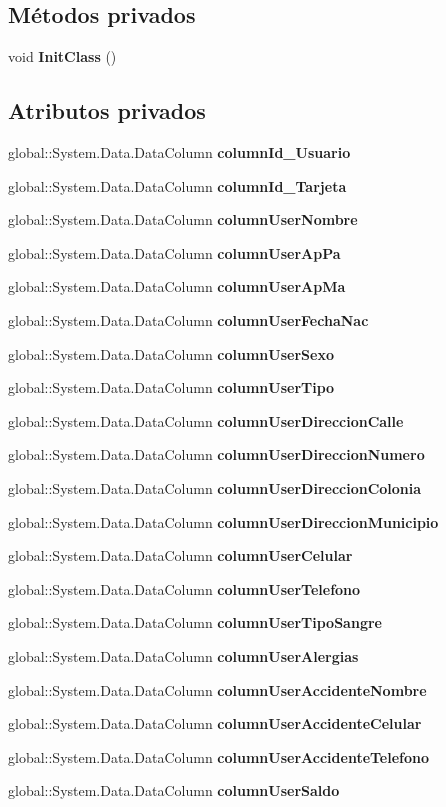 \subsection*{Métodos privados}
\begin{DoxyCompactItemize}
\item 
void {\bf Init\-Class} ()
\end{DoxyCompactItemize}
\subsection*{Atributos privados}
\begin{DoxyCompactItemize}
\item 
global\-::\-System.\-Data.\-Data\-Column {\bf column\-Id\-\_\-\-Usuario}
\item 
global\-::\-System.\-Data.\-Data\-Column {\bf column\-Id\-\_\-\-Tarjeta}
\item 
global\-::\-System.\-Data.\-Data\-Column {\bf column\-User\-Nombre}
\item 
global\-::\-System.\-Data.\-Data\-Column {\bf column\-User\-Ap\-Pa}
\item 
global\-::\-System.\-Data.\-Data\-Column {\bf column\-User\-Ap\-Ma}
\item 
global\-::\-System.\-Data.\-Data\-Column {\bf column\-User\-Fecha\-Nac}
\item 
global\-::\-System.\-Data.\-Data\-Column {\bf column\-User\-Sexo}
\item 
global\-::\-System.\-Data.\-Data\-Column {\bf column\-User\-Tipo}
\item 
global\-::\-System.\-Data.\-Data\-Column {\bf column\-User\-Direccion\-Calle}
\item 
global\-::\-System.\-Data.\-Data\-Column {\bf column\-User\-Direccion\-Numero}
\item 
global\-::\-System.\-Data.\-Data\-Column {\bf column\-User\-Direccion\-Colonia}
\item 
global\-::\-System.\-Data.\-Data\-Column {\bf column\-User\-Direccion\-Municipio}
\item 
global\-::\-System.\-Data.\-Data\-Column {\bf column\-User\-Celular}
\item 
global\-::\-System.\-Data.\-Data\-Column {\bf column\-User\-Telefono}
\item 
global\-::\-System.\-Data.\-Data\-Column {\bf column\-User\-Tipo\-Sangre}
\item 
global\-::\-System.\-Data.\-Data\-Column {\bf column\-User\-Alergias}
\item 
global\-::\-System.\-Data.\-Data\-Column {\bf column\-User\-Accidente\-Nombre}
\item 
global\-::\-System.\-Data.\-Data\-Column {\bf column\-User\-Accidente\-Celular}
\item 
global\-::\-System.\-Data.\-Data\-Column {\bf column\-User\-Accidente\-Telefono}
\item 
global\-::\-System.\-Data.\-Data\-Column {\bf column\-User\-Saldo}
\end{DoxyCompactItemize}


